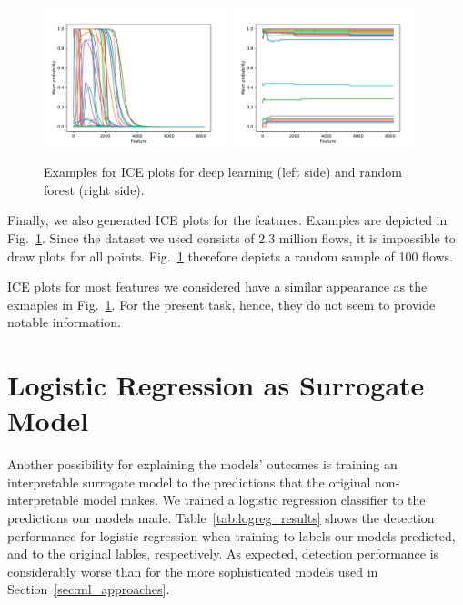 \documentclass[sigconf,nonacm]{acmart}
\begin{document}
\begin{figure}[p]
\includegraphics[width=0.48\textwidth]{plots/ice/apply(stdev(ipTotalLength),forward)_nn_0.pdf}
\includegraphics[width=0.48\textwidth]{plots/ice/apply(stdev(ipTotalLength),forward)_rf_0.pdf}

\caption{Examples for ICE plots for deep learning (left side) and random forest (right side).}
\label{fig:ice}
\end{figure}

Finally, we also generated ICE plots for the features. Examples are depicted in Fig.~\ref{fig:ice}. Since the dataset we used consists of 2.3 million flows, it is impossible to draw plots for all points. Fig.~\ref{fig:ice} therefore depicts a random sample of 100 flows.

ICE plots for most features we considered have a similar appearance as the exmaples in Fig.~\ref{fig:ice}. For the present task, hence, they do not seem to provide notable information.

\section{Logistic Regression as Surrogate Model}
Another possibility for explaining the models' outcomes is training an interpretable surrogate model to the predictions that the original non-interpretable model makes. We trained a logistic regression classifier to the predictions our models made. Table~\ref{tab:logreg_results} shows the detection performance for logistic regression when training to labels our models predicted, and to the original lables, respectively. As expected, detection performance is considerably worse than for the more sophisticated models used in Section~\ref{sec:ml_approaches}.
\end{document}
